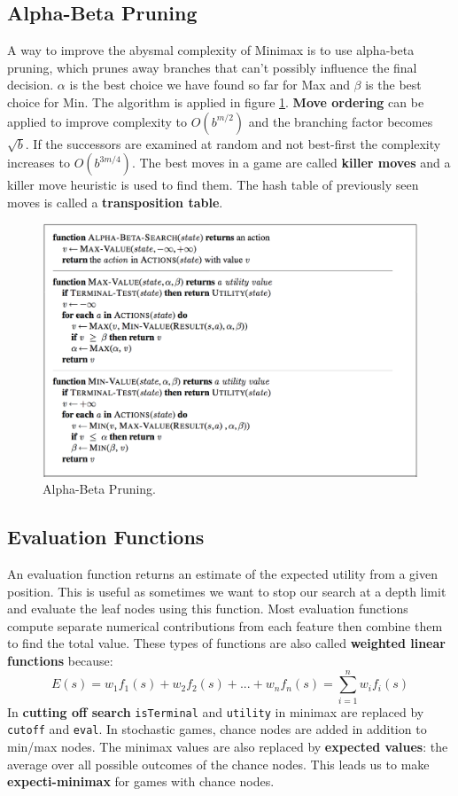\documentclass[twoside]{article}
\begin{document}
\subsection{Alpha-Beta Pruning}
A way to improve the abysmal complexity of Minimax is to use alpha-beta 
pruning, which prunes away branches that can't possibly influence the final
decision. \(\alpha\) is the best choice we have found so far for Max and 
\(\beta\) is the best choice for Min. The algorithm is applied in figure
\ref{fig:alpha-beta}. \textbf{Move ordering} can be applied to improve
complexity to \(O(b^{m/2})\) and the branching factor becomes \(\sqrt{b}\). If the 
successors are examined at random and not best-first the complexity increases
to \(O(b^{3m/4})\). The best moves in a game are called \textbf{killer moves}
and a killer move heuristic is used to find them. The hash table of 
previously seen moves is called a \textbf{transposition table}.
\begin{figure}
  \includegraphics[width=\linewidth]{alpha-beta.png}
  \caption{Alpha-Beta Pruning.}
  \label{fig:alpha-beta}
\end{figure}
\subsection{Evaluation Functions}
An evaluation function returns an estimate of the expected utility from a given
position. This is useful as sometimes we want to stop our search at a depth 
limit and evaluate the leaf nodes using this function. Most evaluation
functions compute separate numerical contributions from each feature then
combine them to find the total value. These types of functions are also called
\textbf{weighted linear functions} because:
\begin{equation}
        E(s) = w_1f_1(s) + w_2f_2(s) + ... + w_nf_n(s) = \sum_{i=1}^{n} w_if_i(s)
\end{equation}
In \textbf{cutting off search} \texttt{isTerminal} and \texttt{utility} in minimax
are replaced by \texttt{cutoff} and \texttt{eval}. In stochastic games, 
chance nodes are added in addition to min/max nodes. The minimax values are also
replaced by \textbf{expected values}: the average over all possible outcomes of 
the chance nodes. This leads us to make \textbf{expecti-minimax} for games with
chance nodes.
\end{document}
